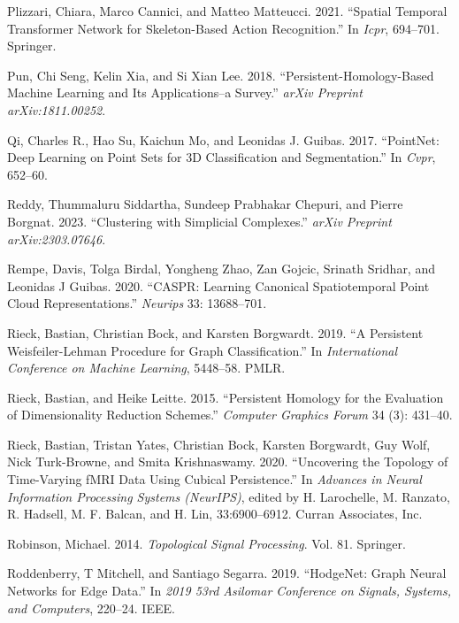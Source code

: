 \documentclass[
  12pt,
]{krantz}
\newlength{\cslhangindent}
\newenvironment{CSLReferences}[2] %
 {\begin{list}{}{%
  \setlength{\itemindent}{0pt}
  \setlength{\leftmargin}{0pt}
  \setlength{\parsep}{0pt}
  \ifodd #1
   \setlength{\leftmargin}{\cslhangindent}
   \setlength{\itemindent}{-1\cslhangindent}
  \fi
  \setlength{\itemsep}{#2\baselineskip}}}
 {\end{list}}
\begin{document}
\begin{CSLReferences}{1}{0}
Plizzari, Chiara, Marco Cannici, and Matteo Matteucci. 2021. {``Spatial
Temporal Transformer Network for Skeleton-Based Action Recognition.''}
In \emph{Icpr}, 694--701. Springer.

Pun, Chi Seng, Kelin Xia, and Si Xian Lee. 2018.
{``Persistent-Homology-Based Machine Learning and Its Applications--a
Survey.''} \emph{arXiv Preprint arXiv:1811.00252}.

Qi, Charles R., Hao Su, Kaichun Mo, and Leonidas J. Guibas. 2017.
{``Point{N}et: Deep Learning on Point Sets for 3{D} Classification and
Segmentation.''} In \emph{Cvpr}, 652--60.

Reddy, Thummaluru Siddartha, Sundeep Prabhakar Chepuri, and Pierre
Borgnat. 2023. {``Clustering with Simplicial Complexes.''} \emph{arXiv
Preprint arXiv:2303.07646}.

Rempe, Davis, Tolga Birdal, Yongheng Zhao, Zan Gojcic, Srinath Sridhar,
and Leonidas J Guibas. 2020. {``{CASPR}: Learning Canonical
Spatiotemporal Point Cloud Representations.''} \emph{Neurips} 33:
13688--701.

Rieck, Bastian, Christian Bock, and Karsten Borgwardt. 2019. {``A
Persistent {W}eisfeiler-{L}ehman Procedure for Graph Classification.''}
In \emph{International Conference on Machine Learning}, 5448--58. PMLR.

Rieck, Bastian, and Heike Leitte. 2015. {``Persistent Homology for the
Evaluation of Dimensionality Reduction Schemes.''} \emph{Computer
Graphics Forum} 34 (3): 431--40.

Rieck, Bastian, Tristan Yates, Christian Bock, Karsten Borgwardt, Guy
Wolf, Nick Turk-Browne, and Smita Krishnaswamy. 2020. {``Uncovering the
Topology of Time-Varying {fMRI} Data Using Cubical Persistence.''} In
\emph{Advances in {Neural} {Information} {Processing} {Systems}
({NeurIPS})}, edited by H. Larochelle, M. Ranzato, R. Hadsell, M. F.
Balcan, and H. Lin, 33:6900--6912. Curran Associates, Inc.

Robinson, Michael. 2014. \emph{Topological Signal Processing}. Vol. 81.
Springer.

Roddenberry, T Mitchell, and Santiago Segarra. 2019. {``Hodge{N}et:
Graph Neural Networks for Edge Data.''} In \emph{2019 53rd Asilomar
Conference on Signals, Systems, and Computers}, 220--24. IEEE.


\end{CSLReferences}
\end{document}
